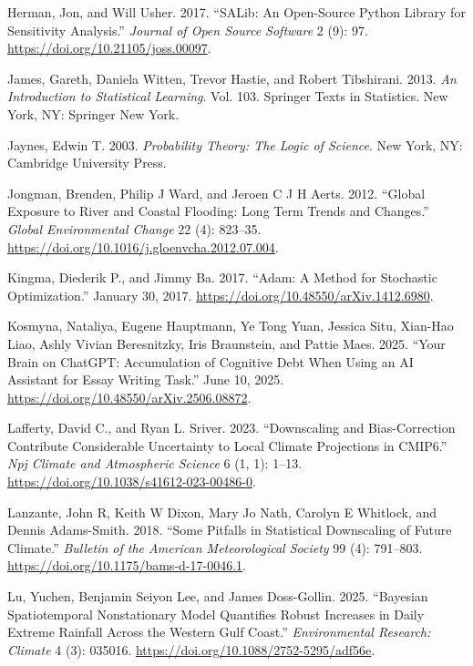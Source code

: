 \documentclass[
  letterpaper,
  DIV=11,
  numbers=noendperiod]{scrreprt}
\newlength{\cslhangindent}
\newenvironment{CSLReferences}[2] %
 {\begin{list}{}{%
  \setlength{\itemindent}{0pt}
  \setlength{\leftmargin}{0pt}
  \setlength{\parsep}{0pt}
  \ifodd #1
   \setlength{\leftmargin}{\cslhangindent}
   \setlength{\itemindent}{-1\cslhangindent}
  \fi
  \setlength{\itemsep}{#2\baselineskip}}}
 {\end{list}}
\begin{document}
\begin{CSLReferences}{1}{0}
Herman, Jon, and Will Usher. 2017. {``{SALib}: {An} Open-Source {Python}
Library for {Sensitivity Analysis}.''} \emph{Journal of Open Source
Software} 2 (9): 97. \url{https://doi.org/10.21105/joss.00097}.

James, Gareth, Daniela Witten, Trevor Hastie, and Robert Tibshirani.
2013. \emph{An {Introduction} to {Statistical Learning}}. Vol. 103.
Springer {Texts} in {Statistics}. New York, NY: Springer New York.

Jaynes, Edwin T. 2003. \emph{Probability Theory: The Logic of Science}.
New York, NY: Cambridge University Press.

Jongman, Brenden, Philip J Ward, and Jeroen C J H Aerts. 2012. {``Global
Exposure to River and Coastal Flooding: Long Term Trends and Changes.''}
\emph{Global Environmental Change} 22 (4): 823--35.
\url{https://doi.org/10.1016/j.gloenvcha.2012.07.004}.

Kingma, Diederik P., and Jimmy Ba. 2017. {``Adam: {A Method} for
{Stochastic Optimization}.''} January 30, 2017.
\url{https://doi.org/10.48550/arXiv.1412.6980}.

Kosmyna, Nataliya, Eugene Hauptmann, Ye Tong Yuan, Jessica Situ,
Xian-Hao Liao, Ashly Vivian Beresnitzky, Iris Braunstein, and Pattie
Maes. 2025. {``Your {Brain} on {ChatGPT}: {Accumulation} of {Cognitive
Debt} When {Using} an {AI Assistant} for {Essay Writing Task}.''} June
10, 2025. \url{https://doi.org/10.48550/arXiv.2506.08872}.

Lafferty, David C., and Ryan L. Sriver. 2023. {``Downscaling and
Bias-Correction Contribute Considerable Uncertainty to Local Climate
Projections in {CMIP6}.''} \emph{Npj Climate and Atmospheric Science} 6
(1, 1): 1--13. \url{https://doi.org/10.1038/s41612-023-00486-0}.

Lanzante, John R, Keith W Dixon, Mary Jo Nath, Carolyn E Whitlock, and
Dennis Adams-Smith. 2018. {``Some {Pitfalls} in {Statistical
Downscaling} of {Future Climate}.''} \emph{Bulletin of the American
Meteorological Society} 99 (4): 791--803.
\url{https://doi.org/10.1175/bams-d-17-0046.1}.

Lu, Yuchen, Benjamin Seiyon Lee, and James Doss-Gollin. 2025.
{``Bayesian Spatiotemporal Nonstationary Model Quantifies Robust
Increases in Daily Extreme Rainfall Across the {Western Gulf Coast}.''}
\emph{Environmental Research: Climate} 4 (3): 035016.
\url{https://doi.org/10.1088/2752-5295/adf56e}.


\end{CSLReferences}
\end{document}
